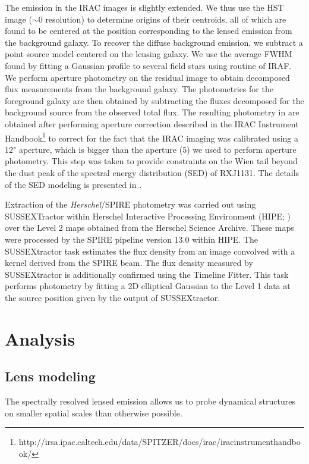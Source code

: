 \documentclass[]{emulateapj}
\begin{document}
The emission in the IRAC images is slightly extended. We thus use the
HST image ($\sim$0 resolution) to determine
origins of their centroids, all of which are found to be
centered at the position corresponding to the lensed emission from the
background galaxy. To recover the diffuse background emission, we subtract a
point source model centered on the lensing galaxy. We use the average
FWHM found by fitting a Gaussian profile to several field stars
using  routine of IRAF.
We perform aperture photometry on the residual image
to obtain decomposed flux measurements from the background galaxy.
The photometries for the foreground galaxy are then obtained
by subtracting the fluxes decomposed for the background source
from the observed total flux. The resulting photometry in
 are obtained after performing aperture correction
described in the IRAC Instrument Handbook\footnote{http://irsa.ipac.caltech.edu/data/SPITZER/docs/irac/iracinstrumenthandbook/} to
correct for the fact that the IRAC imaging was calibrated
using a 12" aperture, which is bigger than the aperture (5) we used to
perform aperture photometry. This step was taken to provide
constraints on the Wien tail beyond the dust peak of the
spectral energy distribution (SED) of RXJ1131.
The details of the SED modeling is presented in .

Extraction of the {\it Herschel}/SPIRE photometry was
carried out using SUSSEXTractor within Herschel Interactive
Processing Environment (HIPE; \citealt{Ott10a})
over the Level 2 maps obtained from the Herschel Science Archive.
These maps were processed by the SPIRE pipeline
version 13.0 within HIPE. The SUSSEXtractor task estimates
the flux density from an image convolved with a kernel
derived from the SPIRE beam. The flux density
measured by SUSSEXtractor is additionally confirmed
using the Timeline Fitter. This task performs photometry
by fitting a 2D elliptical Gaussian to the Level 1 data at the
source position given by the output of SUSSEXtractor.



\section{Analysis}
\subsection{Lens modeling} \label{sec:lensmodel}
The spectrally resolved lensed emission allows us to probe dynamical structures on smaller spatial scales than otherwise possible.
\end{document}
